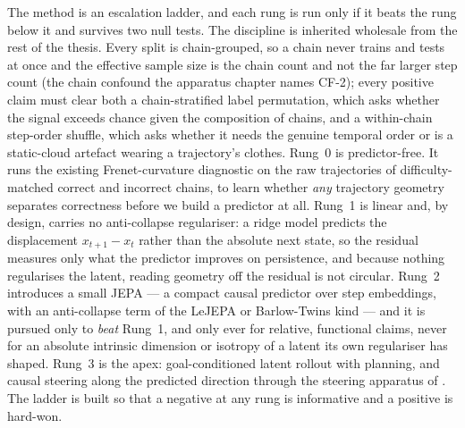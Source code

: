 The method is an escalation ladder, and each rung is run only if it beats the rung
below it and survives two null tests. The discipline is inherited wholesale from
the rest of the thesis. Every split is chain-grouped, so a chain never trains and
tests at once and the effective sample size is the chain count and not the far
larger step count (the chain confound the apparatus chapter names CF-2); every
positive claim must clear both a chain-stratified label permutation, which asks
whether the signal exceeds chance given the composition of chains, and a
within-chain step-order shuffle, which asks whether it needs the genuine temporal
order or is a static-cloud artefact wearing a trajectory's clothes. Rung~0 is
predictor-free. It runs the existing Frenet-curvature diagnostic on the raw
trajectories of difficulty-matched correct and incorrect chains, to learn whether
\emph{any} trajectory geometry separates correctness before we build a predictor
at all. Rung~1 is linear and, by design, carries no anti-collapse regulariser: a
ridge model predicts the displacement $x_{t+1}-x_t$ rather than the absolute next
state, so the residual measures only what the predictor improves on persistence,
and because nothing regularises the latent, reading geometry off the residual is
not circular. Rung~2 introduces a small JEPA --- a compact causal predictor over
step embeddings, with an anti-collapse term of the LeJEPA or Barlow-Twins kind
\citep{balestriero2025lejepa, zbontar2021barlow} --- and it is pursued only to
\emph{beat} Rung~1, and only ever for relative, functional claims, never for an
absolute intrinsic dimension or isotropy of a latent its own regulariser has
shaped. Rung~3 is the apex: goal-conditioned latent rollout with planning, and
causal steering along the predicted direction through the steering apparatus of
. The ladder is built so that a negative at any rung is
informative and a positive is hard-won.

